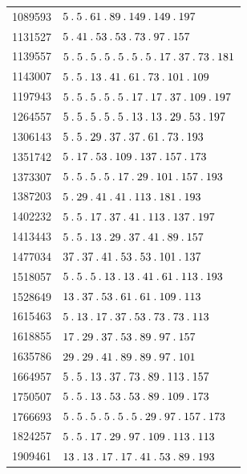 \begin{longtable}{@{}r|l@{}}
1089593 & $5\pdot 5\pdot 61\pdot 89\pdot 149\pdot 149\pdot 197$\\
1131527 & $5\pdot 41\pdot 53\pdot 53\pdot 73\pdot 97\pdot 157$\\
1139557 & $5\pdot 5\pdot 5\pdot 5\pdot 5\pdot 5\pdot 5\pdot 17\pdot 37\pdot 73\pdot 181$\\
1143007 & $5\pdot 5\pdot 13\pdot 41\pdot 61\pdot 73\pdot 101\pdot 109$\\
1197943 & $5\pdot 5\pdot 5\pdot 5\pdot 5\pdot 17\pdot 17\pdot 37\pdot 109\pdot 197$\\
1264557 & $5\pdot 5\pdot 5\pdot 5\pdot 5\pdot 13\pdot 13\pdot 29\pdot 53\pdot 197$\\
1306143 & $5\pdot 5\pdot 29\pdot 37\pdot 37\pdot 61\pdot 73\pdot 193$\\
1351742 & $5\pdot 17\pdot 53\pdot 109\pdot 137\pdot 157\pdot 173$\\
1373307 & $5\pdot 5\pdot 5\pdot 5\pdot 17\pdot 29\pdot 101\pdot 157\pdot 193$\\
1387203 & $5\pdot 29\pdot 41\pdot 41\pdot 113\pdot 181\pdot 193$\\
1402232 & $5\pdot 5\pdot 17\pdot 37\pdot 41\pdot 113\pdot 137\pdot 197$\\
1413443 & $5\pdot 5\pdot 13\pdot 29\pdot 37\pdot 41\pdot 89\pdot 157$\\
1477034 & $37\pdot 37\pdot 41\pdot 53\pdot 53\pdot 101\pdot 137$\\
1518057 & $5\pdot 5\pdot 5\pdot 13\pdot 13\pdot 41\pdot 61\pdot 113\pdot 193$\\
1528649 & $13\pdot 37\pdot 53\pdot 61\pdot 61\pdot 109\pdot 113$\\
1615463 & $5\pdot 13\pdot 17\pdot 37\pdot 53\pdot 73\pdot 73\pdot 113$\\
1618855 & $17\pdot 29\pdot 37\pdot 53\pdot 89\pdot 97\pdot 157$\\
1635786 & $29\pdot 29\pdot 41\pdot 89\pdot 89\pdot 97\pdot 101$\\
1664957 & $5\pdot 5\pdot 13\pdot 37\pdot 73\pdot 89\pdot 113\pdot 157$\\
1750507 & $5\pdot 5\pdot 13\pdot 53\pdot 53\pdot 89\pdot 109\pdot 173$\\
1766693 & $5\pdot 5\pdot 5\pdot 5\pdot 5\pdot 5\pdot 29\pdot 97\pdot 157\pdot 173$\\
1824257 & $5\pdot 5\pdot 17\pdot 29\pdot 97\pdot 109\pdot 113\pdot 113$\\
1909461 & $13\pdot 13\pdot 17\pdot 17\pdot 41\pdot 53\pdot 89\pdot 193$\\

\end{longtable}
